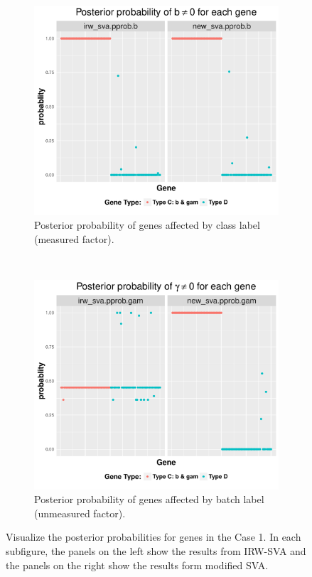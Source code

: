 \documentclass[11pt]{article}
\begin{document}
\begin{figure}[h!]
    \centering
    \begin{subfigure}[t]{0.45\textwidth}
    \centering
    \includegraphics[width = \textwidth]{figures/pprop1_2.pdf}
    \caption{Posterior probability of genes affected by class label (measured factor).}
    \label{fig:pprob1_1}
    \end{subfigure}
    ~
     \begin{subfigure}[t]{0.45\textwidth}
    \centering
    \includegraphics[width = \textwidth]{figures/pprop1_1.pdf}
    \caption{Posterior probability of genes affected by batch label (unmeasured factor).}
    \label{fig:pprob1_2}
    \end{subfigure}
    \caption{Visualize the posterior probabilities for genes in the Case 1. In each subfigure, the panels on the left show the results from IRW-SVA and the panels on the right show the results form modified SVA.}
    \label{fig:visual1}
\end{figure}
\end{document}
